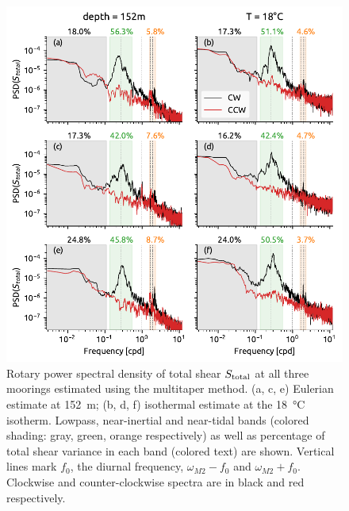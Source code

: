 \documentclass[onecol]{ametsoc}
\begin{document}
\begin{figure}
\centering
\includegraphics[width=39pc]{figure4-nrl-spectra.pdf}
\caption{\label{fig:nrlspectra}
Rotary power spectral density of total shear \(S_\text{total}\) at all three moorings estimated using the multitaper method. (a, c, e) Eulerian estimate at \SI{152}{m}; (b, d, f) isothermal estimate at the \SI{18}{\celsius} isotherm. Lowpass, near-inertial and near-tidal bands (colored shading: gray, green, orange respectively) as well as percentage of total shear variance in each band (colored text) are shown. Vertical lines mark \(f_0\), the diurnal frequency, \(ω_{M2} - f_0\) and \(ω_{M2} + f_0\). Clockwise and counter-clockwise spectra are in black and red respectively.}
\end{figure}
\end{document}
